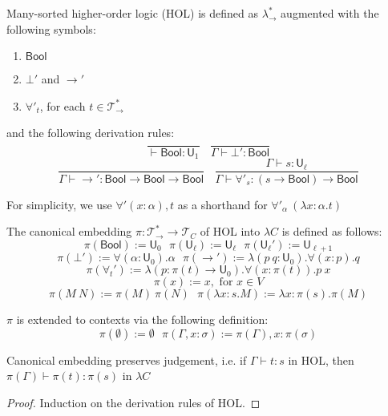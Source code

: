 \begin{definition} Many-sorted higher-order logic (HOL) is defined as $\lambda_\to^*$ augmented
  with the following symbols:
  \begin{enumerate}
    \item $\mathsf{Bool}$
    \item $\bot'$ and $\to'$
    \item $\forall'_t$, for each $t \in \mathcal{T}_\to^*$
  \end{enumerate}
  
  \noindent and the following derivation rules:
  $$\frac{}{\vdash \mathsf{Bool} : \mathsf{U}_1} \ \ \ \ \frac{}{\Gamma \vdash \bot' : \mathsf{Bool}}$$
  $$\frac{}{\Gamma \vdash \to' : \mathsf{Bool} \to \mathsf{Bool} \to \mathsf{Bool}} \ \ \ \
  \frac{\Gamma \vdash s : \mathsf{U}_\ell}{\Gamma \vdash \forall'_s : (s \to \mathsf{Bool}) \to \mathsf{Bool}}$$
  
  \noindent For simplicity, we use $\forall' (x : \alpha), t$ as a shorthand for $\forall'_\alpha \ (\lambda x : \alpha. t)$

  The canonical embedding $\pi : \mathcal{T}_\to^* \to \mathcal{T}_C$ of HOL into $\lambda C$ is defined as follows:
  $$\pi(\mathsf{Bool}) := \mathsf{U}_0 \ \ \ \pi(\mathsf{U}_\ell) := \mathsf{U}_\ell \ \ \
    \pi(\mathsf{U}_\ell') := \mathsf{U}_{\ell + 1}$$
  $$\pi(\bot') := \forall (\alpha : \mathsf{U}_0). \alpha \ \ \
  \pi(\to') := \lambda (p \ q : \mathsf{U}_0). \forall (x : p). q$$
  $$\pi(\forall_t') := \lambda (p : \pi(t) \to \mathsf{U}_0). \forall (x : \pi(t)). p \ x$$
  $$\pi(x) := x, \text{ for } x \in V$$
  $$\pi(M \ N) := \pi(M) \ \pi(N) \ \ \ \pi(\lambda x : s. M) := \lambda x : \pi(s). \pi(M)$$

  \noindent $\pi$ is extended to contexts via the following definition:
  $$\pi(\emptyset) := \emptyset \ \ \ \pi(\Gamma, x : \sigma) := \pi(\Gamma), x : \pi(\sigma)$$


\end{definition}

\begin{theorem}\label{ceptj} Canonical embedding preserves judgement, i.e. if $\Gamma \vdash t : s$ in HOL, then
  $\pi(\Gamma) \vdash \pi(t) : \pi(s)$ in $\lambda C$ \end{theorem}
\begin{proof} Induction on the derivation rules of HOL. \end{proof}

